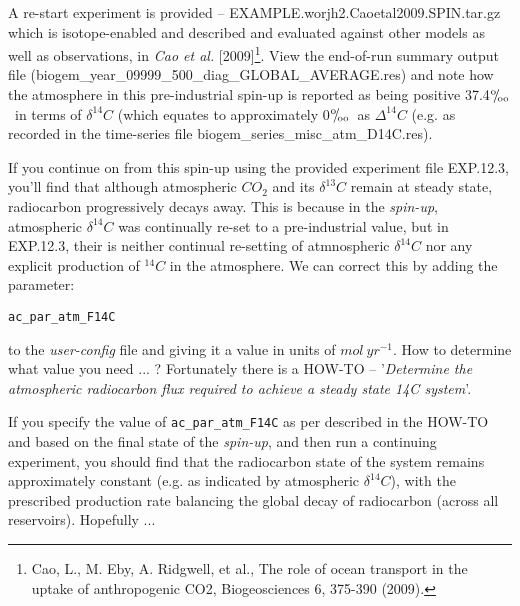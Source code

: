 \documentclass[11pt,fleqn]{book} %
\def\permille{\ensuremath{{}^\text{o}\mkern-5mu/\mkern-3mu_\text{oo}}}
\begin{document}
A re-start experiment is provided -- \textsf{\footnotesize EXAMPLE.worjh2.Caoetal2009.SPIN.tar.gz} which is isotope-enabled and described and evaluated against other models as well as observations, in \textit{Cao et al.} [2009]\footnote{Cao, L., M. Eby, A. Ridgwell, et al., The role of ocean transport in the uptake of anthropogenic CO2, Biogeosciences 6, 375-390 (2009).}. View the end-of-run summary output file (\textsf{\footnotesize biogem\_year\_09999\_500\_diag\_GLOBAL\_AVERAGE.res}) and note how the atmosphere in this pre-industrial spin-up is reported as being positive 37.4\permille \ in terms of \(\delta^{14}C\) (which equates to approximately \(0\)\permille \ as \(\Delta^{14}C\) (e.g. as recorded in the time-series file \textsf{\footnotesize biogem\_series\_misc\_atm\_D14C.res}).

If you continue on from this spin-up using the provided experiment file \textsf{\footnotesize EXP.12.3}, you'll find that although atmospheric \(CO_{2}\) and its \(\delta^{13}C\) remain at steady state, radiocarbon progressively decays away. This is because in the \textit{spin-up}, atmospheric \(\delta^{14}C\) was continually re-set to a pre-industrial value, but in \textsf{\footnotesize EXP.12.3}, their is neither continual re-setting of atmnospheric \(\delta^{14}C\) nor any explicit production of \(^{14}C\) in the atmosphere. We can correct this by adding the parameter:
\vspace{-1mm}\begin{verbatim}
ac_par_atm_F14C
\end{verbatim}\vspace{-1mm}
to the \textit{user-config} file and giving it a value in units of \(mol \ yr^{-1}\). How to determine what value you need ... ?
Fortunately there is a HOW-TO -- '\textit{Determine the atmospheric radiocarbon flux required to achieve a steady state 14C system}'.

If you specify the value of \texttt{ac\_par\_atm\_F14C} as per described in the HOW-TO and based on the final state of the \textit{spin-up}, and then run a continuing experiment, you should find that the radiocarbon state of the system remains approximately constant (e.g. as indicated by atmospheric \(\delta^{14}C\)), with the prescribed production rate balancing the global decay of radiocarbon (across all reservoirs). Hopefully ...


\newpage

\end{document}
